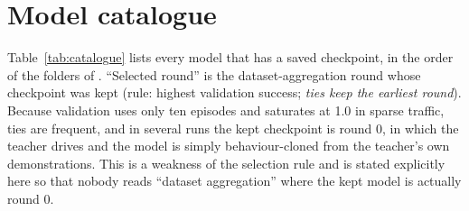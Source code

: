 \section{Model catalogue}\label{sec:catalogue}

Table~\ref{tab:catalogue} lists every model that has a saved checkpoint, in the order of the folders of . ``Selected round'' is the dataset-aggregation round whose checkpoint was kept (rule: highest validation success; \emph{ties keep the earliest round}).
Because validation uses only ten episodes and saturates at 1.0 in sparse traffic, ties are frequent, and in several runs the kept checkpoint is round 0, in which the teacher drives and the model is simply behaviour-cloned from the teacher's own demonstrations.
This is a weakness of the selection rule and is stated explicitly here so that nobody reads ``dataset aggregation'' where the kept model is actually round 0.

